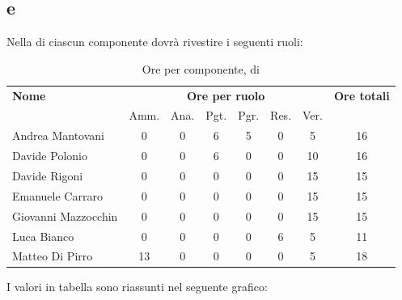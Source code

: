     
    
\pagebreak
\subsection{ e }
Nella  di  ciascun componente dovrà rivestire i seguenti ruoli:

\begin{table}[H]
\begin{tabular}{lccccccc}
\toprule
    \textbf{Nome}  & \multicolumn{6}{c}{\textbf{Ore per ruolo}} & \textbf{Ore totali} \\
     & Amm. & Ana. & Pgt. & Pgr. & Res. & Ver. & \\
    \midrule
    
	   Andrea Mantovani & 0 & 0 & 6 & 5 & 0 & 5 & 16 \\
	     Davide Polonio & 0 & 0 & 6 & 0 & 0 & 10 & 16 \\
	      Davide Rigoni & 0 & 0 & 0 & 0 & 0 & 15 & 15 \\
	   Emanuele Carraro & 0 & 0 & 0 & 0 & 0 & 15 & 15 \\
	Giovanni Mazzocchin & 0 & 0 & 0 & 0 & 0 & 15 & 15 \\
	        Luca Bianco & 0 & 0 & 0 & 0 & 6 & 5 & 11 \\
	    Matteo Di Pirro & 13 & 0 & 0 & 0 & 0 & 5 & 18 \\
    
    \bottomrule
\end{tabular}
\caption{Ore per componente,  di }
\end{table}

I valori in tabella sono riassunti nel seguente grafico: \\ 

